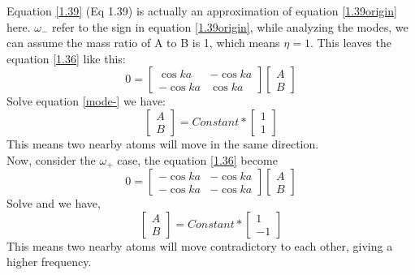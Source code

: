 \documentclass[
	12pt, %
]{fphw}
\begin{document}
Equation \ref{1.39} (Eq 1.39) is actually an approximation of equation \ref{1.39origin} here.	
$\omega_{-}$ refer to the sign in equation \ref{1.39origin}, 
while analyzing the modes, we can assume the mass ratio of A to B is 1, which means
$\eta=1$. This leaves the equation \ref{1.36} like this:
\begin{equation}\label{mode-}
	0=\left[\begin{array}{cc}
		{\cos k a} & {-\cos k a}\\
		{-\cos ka} & {\cos k a}
		\end{array}\right] \left[\begin{array}{c}
			{A} \\
			{B}
			\end{array}\right]
		\end{equation}
Solve equation \ref{mode-} we have:
\begin{equation}
	\left[\begin{array}{c}
		{A} \\
		{B}
		\end{array}\right]
		=
		Constant*\left[\begin{array}{c}
			{1} \\
			{1}
			\end{array}\right]
\end{equation}
This means two nearby atoms will move in the same direction.
\\Now, consider	the $\omega_+$ case, the equation \ref{1.36} become
\begin{equation}\label{mode+}
	0=\left[\begin{array}{cc}
		{-\cos k a} & {-\cos k a}\\
		{-\cos ka} & {-\cos k a}
		\end{array}\right] \left[\begin{array}{c}
			{A} \\
			{B}
			\end{array}\right]
		\end{equation}
Solve and we have,
\begin{equation}
	\left[\begin{array}{c}
		{A} \\
		{B}
		\end{array}\right]
		=
		Constant*\left[\begin{array}{c}
			{1} \\
			{-1}
			\end{array}\right]
\end{equation}
This means two nearby atoms will move contradictory to each other, giving a higher frequency.
\end{document}
